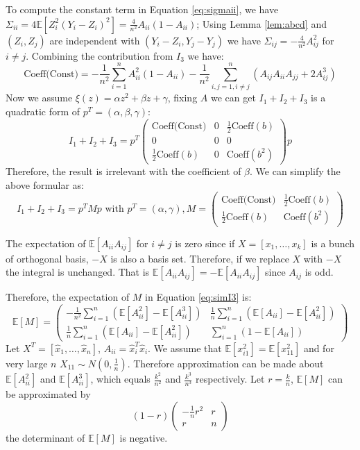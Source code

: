 \documentclass{article}
\def\E{\mathbb{E}}
\begin{document}
To compute the constant term in Equation \eqref{eq:sigmaii}, we have $\Sigma_{ii} = 4\E[Z_i^2 (Y_i-Z_i)^2] = \frac{4}{n^2} A_{ii}(1-A_{ii})$;
Using Lemma \ref{lem:abcd} and $(Z_i, Z_j)$ are independent with $(Y_i - Z_i, Y_j - Y_j)$ we have $\Sigma_{ij} = -\frac{4}{n^2} A_{ij}^2$ for $i \neq j$. Combining the contribution from $I_3$ we have:
\begin{equation}
\textrm{Coeff(Const)} = -\frac{1}{n^2} \sum_{i=1}^n A^2_{ii} (1 -A_{ii}) - \frac{1}{n^2} \sum_{i,j=1,i\neq j}^n (A_{ij}A_{ii}A_{jj} + 2 A_{ij}^3)
\end{equation}
Now we assume $\xi(z) = \alpha z^2 + \beta z + \gamma$, fixing $A$ we can get $I_1 + I_2 + I_3$ is a quadratic form of $p^T = (\alpha, \beta, \gamma)$:
$$
I_1 + I_2 + I_3 =p^T \begin{pmatrix} 
\textrm{Coeff(Const)}  & 0 & \frac{1}{2}\textrm{Coeff}(b) \\ 
0  & 0 & 0 \\ 
\frac{1}{2}\textrm{Coeff}(b)   & 0 & \textrm{Coeff}(b^2) 
\end{pmatrix} p
$$
Therefore, the result is irrelevant with the coefficient of $\beta$.  We can simplify the above formular as:
\begin{equation}\label{eq:simI3}
I_1+I_2+I_3 = p^T M p \textrm{ with } p^T = (\alpha, \gamma), M = \begin{pmatrix} \textrm{Coeff(Const)}  & \frac{1}{2} \textrm{Coeff}(b) \\ \frac{1}{2}\textrm{Coeff}(b) &  \textrm{Coeff}(b^2)  \end{pmatrix}
\end{equation}

The expectation of $\E[A_{ii} A_{ij}]$ for $i \neq j $ is zero since if $X= [x_1, \dots, x_k]$ is a bunch of orthogonal basis, $-X$ is also a basis set. Therefore, if we replace $X$ with $-X$ the integral is unchanged. That is $\E[A_{ii} A_{ij}] = -\E[A_{ii}A_{ij}]$ since $A_{ij}$ is odd. 

Therefore, the expectation of $M$ in Equation \ref{eq:simI3} is:
\begin{equation}\label{eq:2t2}
\E[M] = \begin{pmatrix} -\frac{1}{n^2} \sum_{i=1}^n (\E[A_{ii}^2 ]-\E[A_{ii}^3]) & \frac{1}{n} \sum_{i=1}^n (\E[A_{ii}]-\E[A^2_{ii}]) \\
\frac{1}{n} \sum_{i=1}^n (\E[A_{ii}]-\E[A^2_{ii}]) & \sum_{i=1}^n (1-\E[A_{ii}])
 \end{pmatrix}
\end{equation}
Let $X^T=[\hat{x}_1, \dots, \hat{x}_n]$, $A_{ii}= \hat{x}_i^T \hat{x}_i$. We assume that $\E[x_{i1}^2] = \E[x_{11}^2]$ and for very large $n$ $X_{11} \sim N(0,\frac{1}{n})$. Therefore
approximation can be made about $\E[A_{ii}^2]$ and 
$\E[A_{ii}^3]$, which equals $\frac{k^2}{n^2}$ and $\frac{k^3}{n^3}$ respectively. Let $ r = \frac{k}{n}$, 
$\E[M] $ can be approximated by 
$$
(1-r)\begin{pmatrix}
-\frac{1}{n}r^2 & r \\
r & n
\end{pmatrix}
$$
the determinant of $\E[M]$ is negative. 
\end{document}
